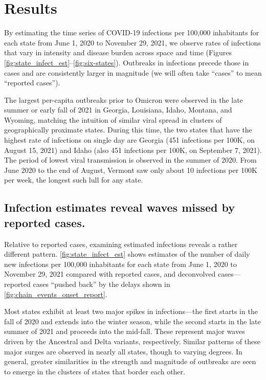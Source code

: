 \section{Results}
\label{sec:results}

By estimating the time series of COVID-19 infections per 100,000 inhabitants
for each \US state from June 1, 2020 to November 29, 2021, we observe rates of
infections that vary in intensity and disease burden across space and time
(Figures \ref{fig:state_infect_est}--\ref{fig:six-states}). Outbreaks in
infections precede those in cases and are consistently larger in magnitude
(we will often take ``cases'' to mean ``reported cases'').

The largest per-capita outbreaks prior to Omicron were observed in the late
summer or early fall of 2021 in Georgia, Louisiana, Idaho, Montana, and Wyoming,
matching the intuition of similar viral spread in clusters of geographically
proximate states. During this time, the two states that have the highest rate of
infections on single day are Georgia (451 infections per 100K, on August 15,
2021) and Idaho (also 451 infections per 100K, on September 7, 2021). The period
of lowest viral transmission is observed in the summer of 2020. From June 2020
to the end of August, Vermont saw only about 10 infections per 100K per week,
the longest such lull for any state.



\subsection{Infection estimates reveal waves missed by reported cases.}
\label{sec:omitted-waves}

Relative to reported cases, examining estimated infections reveals a
rather different pattern. \autoref{fig:state_infect_est} shows
estimates of the number of daily new infections per 100,000 inhabitants for each
\US state from June 1, 2020 to November 29, 2021 compared with reported cases,
and deconvolved cases---reported cases ``pushed back'' by the delays shown in
\autoref{fig:chain_events_onset_report}. 

Most states exhibit at least two major spikes in infections---the first starts
in the fall of 2020 and extends into the winter season, while the second starts
in the late summer of 2021 and proceeds into the mid-fall. These represent major
waves driven by the Ancestral and Delta variants, respectively. Similar patterns
of these major surges are observed in nearly all states, though to varying
degrees. In general, greater similarities in the strength and magnitude of
outbreaks are seen to emerge in the clusters of states that border each other.


